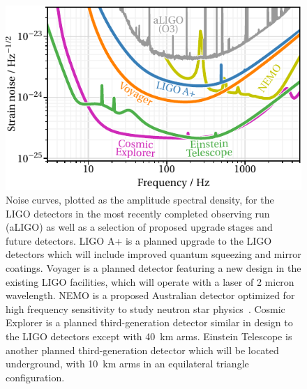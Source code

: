 \begin{figure}[ht]
\includegraphics[width=\textwidth]{Figures/Introduction/asd_curves.pdf}
\caption{Noise curves, plotted as the amplitude spectral density, for the LIGO detectors in the most recently completed observing run (aLIGO) as well as a selection of proposed upgrade stages and future detectors. LIGO A+ is a planned upgrade to the LIGO detectors which will include improved quantum squeezing and mirror coatings. Voyager is a planned detector featuring a new design in the existing LIGO facilities, which will operate with a laser of 2 micron wavelength. NEMO is a proposed Australian detector optimized for high frequency sensitivity to study neutron star physics~\cite{Ackley:2020atn}. Cosmic Explorer is a planned third-generation detector similar in design to the LIGO detectors except with 40~km arms. Einstein Telescope is another planned third-generation detector which will be located underground, with 10~km arms in an equilateral triangle configuration.}
\label{fig:intro_noise_curves}
\end{figure}


